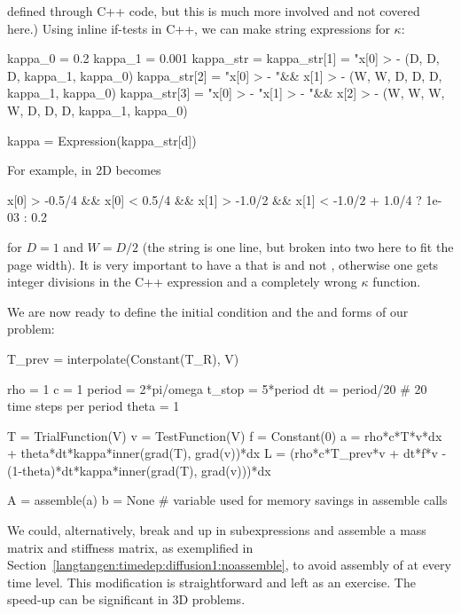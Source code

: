 defined through C++ code, but this is much
more involved and not covered here.)
Using inline if-tests in C++, we can make string expressions for
$\kappa$:
\begin{python}
kappa_0 = 0.2
kappa_1 = 0.001
kappa_str = {}
kappa_str[1] = "x[0] > -%
               (D, D, D, kappa_1, kappa_0)
kappa_str[2] = "x[0] > -%
            "&& x[1] > -%
               (W, W, D, D, D, kappa_1, kappa_0)
kappa_str[3] = "x[0] > -%
               "x[1] > -%
            "&& x[2] > -%
               (W, W, W, W, D, D, D, kappa_1, kappa_0)

kappa = Expression(kappa_str[d])
\end{python}
For example, in 2D  becomes
\begin{progoutput}
x[0] > -0.5/4 && x[0] < 0.5/4 && x[1] > -1.0/2 &&
x[1] < -1.0/2 + 1.0/4 ? 1e-03 : 0.2
\end{progoutput}
\noindent
for $D=1$ and $W=D/2$ (the string is one line, but
broken into two here to fit the page width). It is very important to have
a  that is  and not , otherwise one gets
integer divisions in the C++ expression and a completely wrong $\kappa$
function.

We are now ready to define the initial condition and the
 and  forms of our problem:
\begin{python}
T_prev = interpolate(Constant(T_R), V)

rho = 1
c = 1
period = 2*pi/omega
t_stop = 5*period
dt = period/20  # 20 time steps per period
theta = 1

T = TrialFunction(V)
v = TestFunction(V)
f = Constant(0)
a = rho*c*T*v*dx + theta*dt*kappa*inner(grad(T), grad(v))*dx
L = (rho*c*T_prev*v + dt*f*v -
     (1-theta)*dt*kappa*inner(grad(T), grad(v)))*dx

A = assemble(a)
b = None  # variable used for memory savings in assemble calls
\end{python}
We could, alternatively, break  and  up in subexpressions
and assemble a mass matrix and stiffness matrix, as exemplified in
Section~\ref{langtangen:timedep:diffusion1:noassemble}, to avoid
assembly of  at every time level. This modification is
straightforward and left as an exercise. The speed-up can be significant
in 3D problems.

